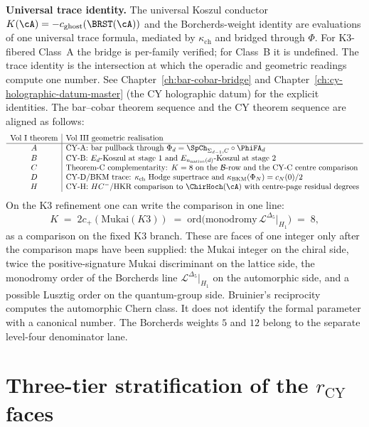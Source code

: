 \medskip
\noindent\textbf{Universal trace identity.}
The universal Koszul conductor
$K(\cA) = -c_{\mathrm{ghost}}(\BRST(\cA))$ and the
Borcherds-weight identity are evaluations of one
universal trace formula, mediated by $\kappa_{\mathrm{ch}}$
and bridged through $\Phi$. For K3-fibered Class~A the
bridge is per-family verified; for Class~B it is undefined.
The trace identity is the intersection at which the operadic
and geometric readings compute one number.
See
Chapter~\ref{ch:bar-cobar-bridge} and Chapter~\ref{ch:cy-holographic-datum-master}
(the CY holographic datum) for the explicit identities.
The bar--cobar theorem sequence and the CY theorem sequence are aligned as
follows:
\[
\begin{array}{c|l}
\text{Vol~I theorem} & \text{Vol~III geometric realisation} \\ \hline
A & \text{CY-A: bar pullback through }
 \Phi_d=\SpCh_{\Sigma_{d-1},C}\circ\PhiFA_d \\
B & \text{CY-B: }E_d\text{-Koszul at stage~1 and }
 E_{n_{\mathrm{native}}(d)}\text{-Koszul at stage~2} \\
C & \text{Theorem-C complementarity: }K=8\text{ on the }\mathcal B
 \text{-row and the CY-C centre comparison} \\
D & \text{CY-D/BKM trace: }\kappa_{\mathrm{ch}}\text{ Hodge supertrace and }
 \kappa_{\mathrm{BKM}}(\Phi_N)=c_N(0)/2 \\
H & \text{CY-H: }HC^-\text{/HKR comparison to }\ChirHoch(\cA)
 \text{ with centre-page residual degrees}
\end{array}
\]
On the K3 refinement one can write the comparison in one line:
\[
 K
 \;=\;
 2c_+(\mathrm{Mukai}(K3))
 \;=\;
 \mathrm{ord}\bigl(
 \mathrm{monodromy}\,\mathcal{L}^{\Delta_5}|_{H_1}
 \bigr)
 \;=\;
 8,
\]
as a comparison on the fixed K3 branch. These are faces of one
integer only after the comparison maps have been supplied: the
Mukai integer on the chiral side, twice the
positive-signature Mukai discriminant on the lattice side, the
monodromy order of the Borcherds line $\mathcal L^{\Delta_5}|_{H_1}$
on the automorphic side, and a possible Lusztig order on the
quantum-group side. Bruinier's reciprocity computes the automorphic
Chern class. It does not identify the formal parameter with a
canonical number. The Borcherds weights \(5\) and \(12\) belong to the
separate level-four denominator lane.

\section{Three-tier stratification of the \texorpdfstring{$r_{\mathrm{CY}}$}{r-CY} faces}
\label{sec:r-cy-three-tier}


